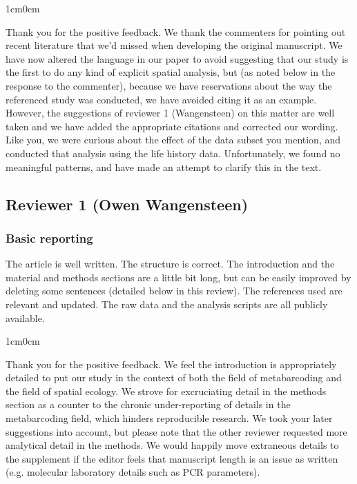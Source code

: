 \documentclass{article}
\newenvironment{response}
	{
	\begin{adjustwidth}{1cm}{0cm}
	\color{peerjBlue}
	}
	{
	\end{adjustwidth}
	}
\begin{document}
\begin{response}
  Thank you for the positive feedback.
	We thank the commenters for pointing out recent literature that we’d missed when developing the original manuscript.
	We have now altered the language in our paper to avoid suggesting that our study is the first to do any kind of explicit spatial analysis, but (as noted below in the response to the commenter), because we have reservations about the way the referenced study was conducted, we have avoided citing it as an example.
	However, the suggestions of reviewer 1 (Wangensteen) on this matter are well taken and we have added the appropriate citations and corrected our wording.
	\\

	Like you, we were curious about the effect of the data subset you mention, and conducted that analysis using the life history data. Unfortunately, we found no meaningful patterns, and have made an attempt to clarify this in the text.
	\\
\end{response}


\subsection*{Reviewer 1 (Owen Wangensteen)}

\subsubsection*{Basic reporting}
The article is well written. The structure is correct. The introduction and the material and methods sections are a little bit long, but can be easily improved by deleting some sentences (detailed below in this review). The references used are relevant and updated. The raw data and the analysis scripts are all publicly available.
\begin{response}
	Thank you for the positive feedback.
	We feel the introduction is appropriately detailed to put our study in the context of both the field of metabarcoding and the field of spatial ecology.
	We strove for excruciating detail in the methods section as a counter to the chronic under-reporting of details in the metabarcoding field, which hinders reproducible research.
	We took your later suggestions into account, but please note that the other reviewer requested more analytical detail in the methods.
	We would happily move extraneous details to the supplement if the editor feels that manuscript length is an issue as written (e.g. molecular laboratory details such as PCR parameters).\\
\end{response}
\end{document}
